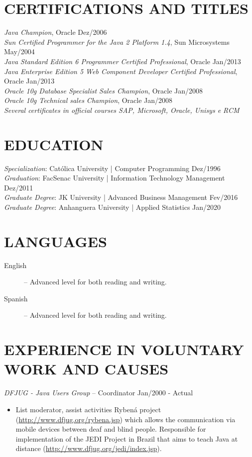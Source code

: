 \documentclass{res}
\begin{document}
\begin{resume}
		\section{CERTIFICATIONS AND TITLES}
		\vspace{8pt}
		{\sl Java Champion}, Oracle \hfill Dez/2006 \\
		{\sl Sun Certified Programmer for the Java 2 Platform 1.4}, Sun Microsystems \hfill May/2004 \\
		{\sl Java Standard Edition 6 Programmer Certified Professional}, Oracle \hfill Jan/2013 \\
		{\sl Java Enterprise Edition 5 Web Component Developer Certified Professional}, Oracle \hfill Jan/2013 \\
		{\sl Oracle 10g Database Specialist Sales Champion}, Oracle \hfill Jan/2008 \\
		{\sl Oracle 10g Technical sales Champion}, Oracle \hfill Jan/2008 \\
		{\sl Several certificates in official courses SAP, Microsoft, Oracle, Unisys e RCM}
		
		\section{EDUCATION}
		\vspace{8pt} 
		{\sl Specialization}: Católica University | Computer Programming
		\hfill Dez/1996 \\
		{\sl Graduation}: FacSenac University | Information Technology Management
		\hfill Dez/2011 \\
		{\sl Graduate Degree}: JK University | Advanced Business Management 
		\hfill Fev/2016 \\
		{\sl Graduate Degree}: Anhanguera University | Applied Statistics
		\hfill Jan/2020
		
		\section{LANGUAGES} 
		\vspace{18pt}
		\begin{description}
			\item[English] -- Advanced level for both reading and writing.
			\item[Spanish] -- Advanced level for both reading and writing.
		\end{description}
		
		\section{EXPERIENCE IN VOLUNTARY WORK AND CAUSES}
		\vspace{8pt} 
		{\sl DFJUG - Java Users Group} -- Coordinator \hfill Jan/2000 - Actual
		\begin{itemize}
			\item List moderator, assist activities Rybená project (\url{http://www.dfjug.org/rybena.jsp}) 
			which allows the communication via mobile devices between deaf and blind people. Responsible for implementation
			of the JEDI Project in Brazil that aims to teach Java at distance (\url{http://www.dfjug.org/jedi/index.jsp}).
		\end{itemize}
		

\end{resume}
\end{document}
